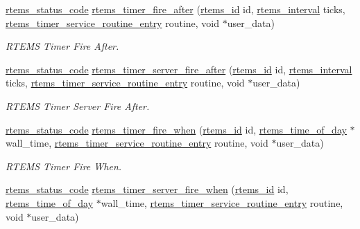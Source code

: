 \begin{DoxyCompactItemize}
\mbox{\hyperlink{group__ClassicStatus_ga545d41846817eaba6143d52ee4d9e9fe}{rtems\+\_\+status\+\_\+code}} \mbox{\hyperlink{group__ClassicTimer_gad9785a6bd78ab5a591a134d147b2bdd3}{rtems\+\_\+timer\+\_\+fire\+\_\+after}} (\mbox{\hyperlink{group__ClassicTasks_gab20892b814dced7dd4e5b9bf42becd57}{rtems\+\_\+id}} id, \mbox{\hyperlink{group__ClassicTasks_gad39c43f949683d46874e3a5586b93aee}{rtems\+\_\+interval}} ticks, \mbox{\hyperlink{group__ClassicTimer_gab7851346dd520066ddc58a25de671f51}{rtems\+\_\+timer\+\_\+service\+\_\+routine\+\_\+entry}} routine, void $\ast$user\+\_\+data)
\begin{DoxyCompactList}\small\item\em R\+T\+E\+MS Timer Fire After. \end{DoxyCompactList}\item 
\mbox{\hyperlink{group__ClassicStatus_ga545d41846817eaba6143d52ee4d9e9fe}{rtems\+\_\+status\+\_\+code}} \mbox{\hyperlink{group__ClassicTimer_ga521234c97e4fbf2d2e759d78447b5a8f}{rtems\+\_\+timer\+\_\+server\+\_\+fire\+\_\+after}} (\mbox{\hyperlink{group__ClassicTasks_gab20892b814dced7dd4e5b9bf42becd57}{rtems\+\_\+id}} id, \mbox{\hyperlink{group__ClassicTasks_gad39c43f949683d46874e3a5586b93aee}{rtems\+\_\+interval}} ticks, \mbox{\hyperlink{group__ClassicTimer_gab7851346dd520066ddc58a25de671f51}{rtems\+\_\+timer\+\_\+service\+\_\+routine\+\_\+entry}} routine, void $\ast$user\+\_\+data)
\begin{DoxyCompactList}\small\item\em R\+T\+E\+MS Timer Server Fire After. \end{DoxyCompactList}\item 
\mbox{\hyperlink{group__ClassicStatus_ga545d41846817eaba6143d52ee4d9e9fe}{rtems\+\_\+status\+\_\+code}} \mbox{\hyperlink{group__ClassicTimer_gabd9f3904baedbd02fb540fdc52d2d067}{rtems\+\_\+timer\+\_\+fire\+\_\+when}} (\mbox{\hyperlink{group__ClassicTasks_gab20892b814dced7dd4e5b9bf42becd57}{rtems\+\_\+id}} id, \mbox{\hyperlink{structrtems__time__of__day}{rtems\+\_\+time\+\_\+of\+\_\+day}} $\ast$wall\+\_\+time, \mbox{\hyperlink{group__ClassicTimer_gab7851346dd520066ddc58a25de671f51}{rtems\+\_\+timer\+\_\+service\+\_\+routine\+\_\+entry}} routine, void $\ast$user\+\_\+data)
\begin{DoxyCompactList}\small\item\em R\+T\+E\+MS Timer Fire When. \end{DoxyCompactList}\item 
\mbox{\hyperlink{group__ClassicStatus_ga545d41846817eaba6143d52ee4d9e9fe}{rtems\+\_\+status\+\_\+code}} \mbox{\hyperlink{group__ClassicTimer_ga2bdd05c6144a723410df17dfaa125adc}{rtems\+\_\+timer\+\_\+server\+\_\+fire\+\_\+when}} (\mbox{\hyperlink{group__ClassicTasks_gab20892b814dced7dd4e5b9bf42becd57}{rtems\+\_\+id}} id, \mbox{\hyperlink{structrtems__time__of__day}{rtems\+\_\+time\+\_\+of\+\_\+day}} $\ast$wall\+\_\+time, \mbox{\hyperlink{group__ClassicTimer_gab7851346dd520066ddc58a25de671f51}{rtems\+\_\+timer\+\_\+service\+\_\+routine\+\_\+entry}} routine, void $\ast$user\+\_\+data)

\end{DoxyCompactItemize}
